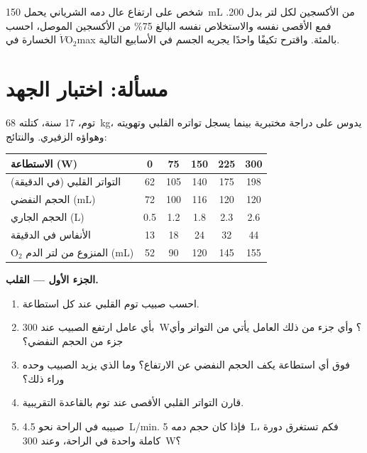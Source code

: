\begin{exercise}[$\star\star\star$]\label{exo:g10:heart-lungs-effort:15}
شخص على ارتفاع عال دمه الشرياني يحمل \qty{150}{mL} من الأكسجين لكل لتر
بدل \num{200}. فمع  الأقصى نفسه والاستخلاص نفسه البالغ
75\% من الأكسجين الموصل، احسب الخسارة في $\dot V\!\mathrm{O_2}$max
بالمئة. واقترح تكيفًا واحدًا يجريه الجسم في الأسابيع التالية.
\end{exercise}

\section{مسألة: اختبار الجهد}

\begin{problem}
\label{pb:g10:heart-lungs-effort:1}
توم، 17 سنة، كتلته \qty{68}{kg}، يدوس على دراجة مختبرية بينما يسجل
تواتره القلبي وتهويته وهواؤه الزفيري. والنتائج:

\begin{center}
\begin{tabular}{lccccc}
الاستطاعة (W) & 0 & 75 & 150 & 225 & 300 \\ \hline
التواتر القلبي (في الدقيقة) & 62 & 105 & 140 & 175 & 198 \\
الحجم النفضي (mL) & 72 & 100 & 116 & 120 & 120 \\
الحجم الجاري (L) & 0.5 & 1.2 & 1.8 & 2.3 & 2.6 \\
الأنفاس في الدقيقة & 13 & 18 & 24 & 32 & 44 \\
$\mathrm{O_2}$ المنزوع من لتر الدم (mL) & 52 & 90 & 120 & 145 & 155 \\
\end{tabular}
\end{center}

\medskip
\noindent\textbf{الجزء الأول --- القلب.}
\begin{enumerate}
  \item احسب صبيب توم القلبي عند كل استطاعة.
  \item بأي عامل ارتفع الصبيب عند \qty{300}{W}؟ وأي جزء من ذلك العامل
        يأتي من التواتر وأي جزء من الحجم النفضي؟
  \item فوق أي استطاعة يكف الحجم النفضي عن الارتفاع؟ وما الذي يزيد
        الصبيب وحده وراء ذلك؟
  \item قارن التواتر القلبي الأقصى عند توم بالقاعدة التقريبية.
  \item صبيبه في الراحة نحو \qty{4.5}{L/min}. فإذا كان حجم دمه
        \qty{5}{L}، فكم تستغرق دورة كاملة واحدة في الراحة، وعند
        \qty{300}{W}؟
\end{enumerate}


\end{problem}

